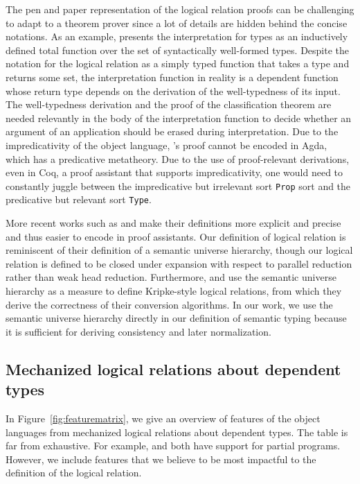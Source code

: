 \documentclass[acmsmall,screen=true,
\ifpublic review=false\else,review=true\fi
  ,anonymous=\ifanonymous true\else false\fi]{acmart}
\begin{document}
The pen and paper representation of the logical relation proofs
can be challenging to adapt to a theorem prover since a lot of details
are hidden behind the concise notations.
As an example, \citet{geuvers1994short} presents the interpretation for types as
an inductively defined total function over the set of syntactically
well-formed types. Despite the notation for the logical relation as a
simply typed function that takes a type and returns some set, the
interpretation function in reality is a dependent function whose
return type depends on the derivation of the well-typedness of its
input. The well-typedness derivation and the proof of the
classification theorem are needed relevantly in the body
of the interpretation function to decide whether an argument of an
application should be erased during interpretation. Due to the
impredicativity of the object language, \citet{geuvers1994short}'s
proof cannot be encoded in Agda, which has a predicative
metatheory. Due to the use of proof-relevant derivations, even in
Coq, a proof assistant that supports impredicativity, one would need
to constantly juggle between the impredicative but irrelevant sort
\texttt{Prop} sort and the predicative but relevant sort
\texttt{Type}.

More recent works such as \citet{Abel12}
and\citet{abel2008betaeta} make their definitions more explicit and
precise and thus easier to encode in proof assistants. Our definition
of logical relation is reminiscent of their definition of a
semantic universe hierarchy, though our logical relation is defined to
be closed under expansion with respect to parallel reduction rather
than weak head reduction. Furthermore, \citet{Abel12} and
\citet{abel2008betaeta} use the semantic universe hierarchy as a
measure to define Kripke-style logical relations, from which they
derive the correctness of their conversion algorithms. In our work, we
use the semantic universe hierarchy directly in our definition of
semantic typing because it is sufficient
for deriving consistency and later normalization.

\subsection{Mechanized logical relations about dependent types}
In Figure~\ref{fig:featurematrix}, we give an overview of features of
the object languages from mechanized logical relations about dependent
types. The table is far from exhaustive. For example,
\citet{casinghino:combining-proofs-programs} and
\citet{anand2014towards} both have support for partial
programs. However, we include features that we believe to be most
impactful to the definition of the logical relation.
\end{document}
